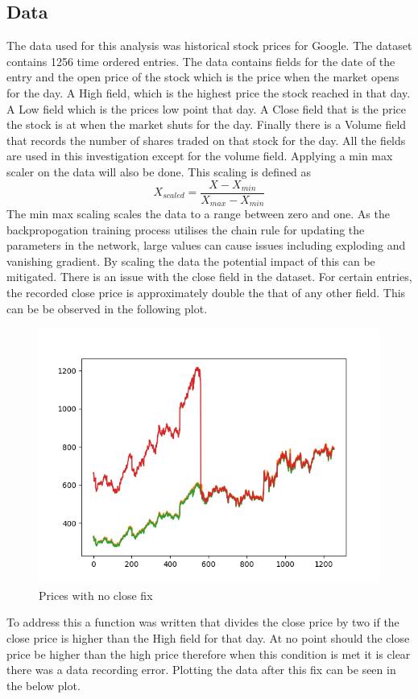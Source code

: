 \documentclass[10pt,twocolumn,letterpaper]{article}
\newcommand{\squeezeup}{\vspace{-10.0mm}}
\begin{document}
\subsection{Data}
The data used for this analysis was historical stock prices for Google. The dataset 
contains 1256 time ordered entries.  The data contains fields for the date of the 
entry and the open price of the stock which is the price when the market opens for the day.
A High field, which is the highest price the stock reached in that day. A Low field 
which is the prices low point that day. A Close field that is the price the stock is 
at when the market shuts for the day. Finally there is a Volume field that records the 
number of shares traded on that stock for the day. All the fields are used in this 
investigation except for the volume field. Applying a min max scaler on the data 
will also be done. This scaling is defined as 
\begin{equation}
   X_{scaled} = \dfrac{X-X_{min}}{X_{max}-X_{min}}
\end{equation}
The min max scaling scales the data to a range between zero and one. As the backpropogation 
training process utilises the chain rule for updating the parameters in the network, large 
values can cause issues including exploding and vanishing gradient. By scaling the data the 
potential impact of this can be mitigated.
There is an issue with the close field in the dataset. For certain entries, the recorded 
close price is approximately double the that of any other field. This can be be observed 
in the following plot.
\begin{center}
   \begin{figure}[H]
   \includegraphics[scale=0.5]{close_no_fix.png}
   \caption{Prices with no close fix }
   \end{figure}
 \end{center}
 \squeezeup
To address this a function was written that divides the close price by two if the 
close price is higher than the High field for that day. At no point should the 
close price be higher than the high price therefore when this condition is met it 
is clear there was a data recording error. Plotting the data after this 
fix can be seen in the below plot.
\end{document}
